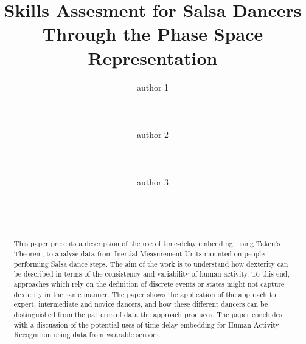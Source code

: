 \documentclass{sigchi}
\begin{document}
\title{Skills Assesment for Salsa Dancers \\
Through the Phase Space Representation}

\author{
  \alignauthor author 1\\
    \\
    \\
    \\
  \alignauthor author 2\\ %
    \\
    \\
    \\
  \alignauthor author 3\\ %
    \\
    \\
    \\
}

\maketitle

\begin{abstract}
This paper presents a description of the use of time-delay embedding, using Taken's Theorem, 
to analyse data from Inertial Measurement Units mounted on people performing Salsa dance steps.  
The aim of the work is to understand how dexterity can be described in terms of the consistency 
and variability of human activity. To this end, approaches which rely on the definition of 
discrete events or states might not capture dexterity in the same manner. 
The paper shows the application of the approach to expert, intermediate and novice dancers, 
and how these different dancers can be distinguished from the patterns of data the approach produces. 
The paper concludes with a discussion of the potential uses of time-delay embedding for 
Human Activity Recognition using data from wearable sensors.


\end{abstract}

\end{document}

